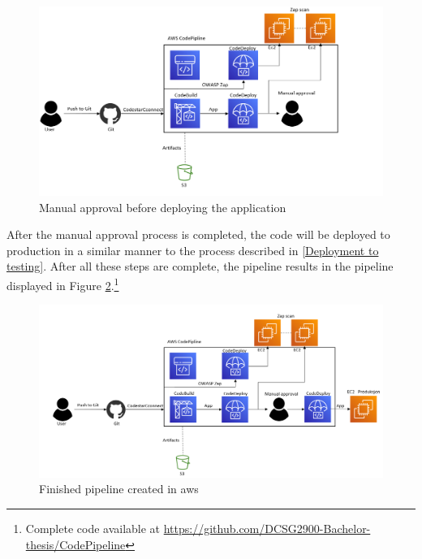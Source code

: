 \vspace{2mm}
\begin{figure}[H]
    \centering
    \includegraphics[width=0.8\columnwidth]{Images/aws-piplin-6.png}
    \caption{Manual approval before deploying the application}
    \label{fig: Manual approval before deploying the application}
\end{figure}

After the manual approval process is completed, the code will be deployed to production in a similar manner to the process described in \ref{Deployment to testing}. After all these steps are complete, the pipeline results in the pipeline displayed in Figure \ref{fig: Finished pipeline created in AWS}.\footnote{Complete code available at \url{https://github.com/DCSG2900-Bachelor-thesis/CodePipeline}}

\vspace{2mm}
\begin{figure}[H]
    \centering
    \includegraphics[width=0.8\columnwidth]{Images/aws-piplin-7.png}
    \caption{Finished pipeline created in \acrshort{aws}}
    \label{fig: Finished pipeline created in AWS}
\end{figure}